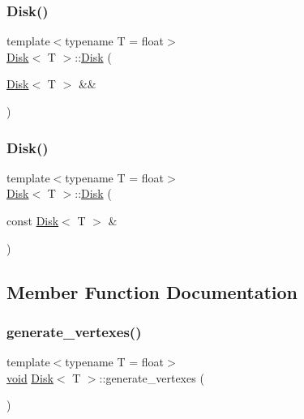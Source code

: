 \mbox{\label{classDisk_a893da931e3f39c126c434ab2fc2e12cc}} 
\subsubsection{\texorpdfstring{Disk()}{Disk()}\hspace{0.1cm}{\footnotesize\ttfamily [3/4]}}
{\footnotesize\ttfamily template$<$typename T  = float$>$ \\
\mbox{\hyperlink{classDisk}{Disk}}$<$ T $>$\+::\mbox{\hyperlink{classDisk}{Disk}} (\begin{DoxyParamCaption}\item[{\mbox{\hyperlink{classDisk}{Disk}}$<$ T $>$ \&\&}]{ }\end{DoxyParamCaption})\hspace{0.3cm}{\ttfamily [default]}}

\mbox{\label{classDisk_a96de79b2e115c478a33cc31f4818aee9}} 
\subsubsection{\texorpdfstring{Disk()}{Disk()}\hspace{0.1cm}{\footnotesize\ttfamily [4/4]}}
{\footnotesize\ttfamily template$<$typename T  = float$>$ \\
\mbox{\hyperlink{classDisk}{Disk}}$<$ T $>$\+::\mbox{\hyperlink{classDisk}{Disk}} (\begin{DoxyParamCaption}\item[{const \mbox{\hyperlink{classDisk}{Disk}}$<$ T $>$ \&}]{ }\end{DoxyParamCaption})\hspace{0.3cm}{\ttfamily [default]}}



\subsection{Member Function Documentation}
\mbox{\label{classDisk_a1588532798901180b1eef6f3e1fb83f6}} 
\subsubsection{\texorpdfstring{generate\+\_\+vertexes()}{generate\_vertexes()}\hspace{0.1cm}{\footnotesize\ttfamily [1/2]}}
{\footnotesize\ttfamily template$<$typename T  = float$>$ \\
\mbox{\hyperlink{glad_8h_a950fc91edb4504f62f1c577bf4727c29}{void}} \mbox{\hyperlink{classDisk}{Disk}}$<$ T $>$\+::generate\+\_\+vertexes (\begin{DoxyParamCaption}{ }\end{DoxyParamCaption})\hspace{0.3cm}{\ttfamily [private]}}

